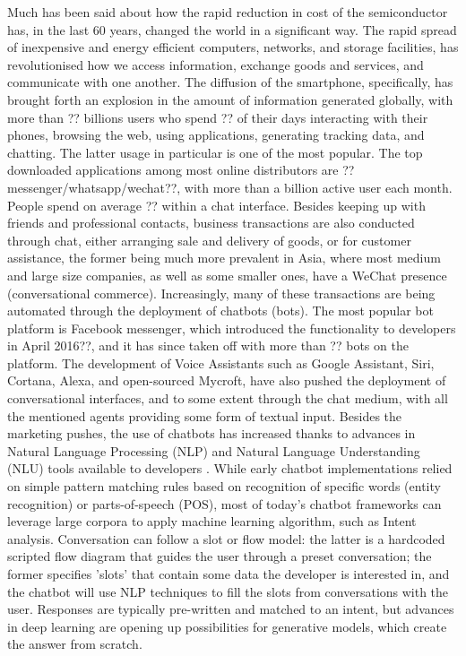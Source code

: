 \documentclass{article}
\begin{document}
Much has been said about how the rapid reduction in cost of the semiconductor has, in the last 60 years, changed the world in a significant way. The rapid spread of inexpensive and energy efficient computers, networks, and storage facilities, has revolutionised how we access information, exchange goods and services, and communicate with one another. The diffusion of the smartphone, specifically, has brought forth an explosion in the amount of information generated globally, with more than ?? billions users who spend ?? of their days interacting with their phones, browsing the web, using applications, generating tracking data, and chatting. The latter usage in particular is one of the most popular. The top downloaded applications among most online distributors are ??messenger/whatsapp/wechat??, with more than a billion active user each month. People spend on average ?? within a chat interface.
Besides keeping up with friends and professional contacts, business transactions are also conducted through chat, either arranging sale and delivery of goods, or for customer assistance, the former being much more prevalent in Asia, where most medium and large size companies, as well as some smaller ones, have a WeChat presence (conversational commerce). Increasingly, many of these transactions are being automated through the deployment of chatbots (bots). The most popular bot platform is Facebook messenger, which introduced the functionality to developers in April 2016??, and it has since taken off with more than ?? bots on the platform. The development of Voice Assistants such as Google Assistant, Siri, Cortana, Alexa, and open-sourced Mycroft, have also pushed the deployment of conversational interfaces, and to some extent through the chat medium, with all the mentioned agents providing some form of textual input.
Besides the marketing pushes, the use of chatbots has increased thanks to advances in Natural Language Processing (NLP) and Natural Language Understanding (NLU)
tools available to developers \cite{JavierCouto}.
While early chatbot implementations relied on simple pattern matching rules based on recognition of specific words (entity recognition) or parts-of-speech (POS), most of today's chatbot frameworks can leverage large corpora to apply machine learning algorithm, such as Intent analysis. Conversation can follow a slot or flow model: the latter is a hardcoded scripted flow diagram that guides the user through a preset conversation; the former specifies 'slots' that contain some data the developer is interested in, and the chatbot will use NLP techniques to fill the slots from conversations with the user. Responses are typically pre-written and matched to an intent, but advances in deep learning are opening up possibilities for generative models, which create the answer from scratch\cite{Gregori}. \\
\end{document}
